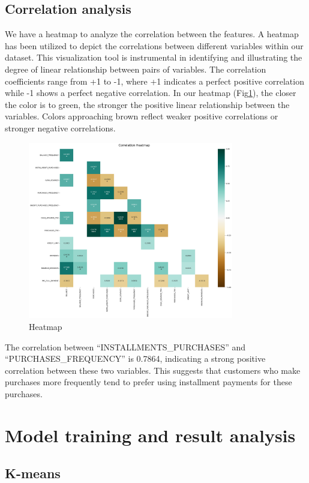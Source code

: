 \documentclass{article}
\begin{document}
\subsection{Correlation analysis}
We have a heatmap to analyze the correlation between the features. A heatmap has been utilized to depict the correlations between different variables within our dataset. This visualization tool is instrumental in identifying and illustrating the degree of linear relationship between pairs of variables. The correlation coefficients range from +1 to -1, where +1 indicates a perfect positive correlation while -1 shows a perfect negative correlation. In our heatmap (Fig\ref{fig:heatmap}), the closer the color is to green, the stronger the positive linear relationship between the variables. Colors approaching brown reflect weaker positive correlations or stronger negative correlations.
\begin{figure}[hbt!]
    \centering
    \includegraphics[width=0.8\textwidth]{fig/zya/heatmap.png}
    \caption{Heatmap}
    \label{fig:heatmap}  %
\end{figure}

The correlation between ``INSTALLMENTS\_PURCHASES'' and ``PURCHASES\_FREQUENCY'' is 0.7864, indicating a strong positive correlation between these two variables. This suggests that customers who make purchases more frequently tend to prefer using installment payments for these purchases.

\section{Model training and result analysis}
\subsection{K-means}
\end{document}
